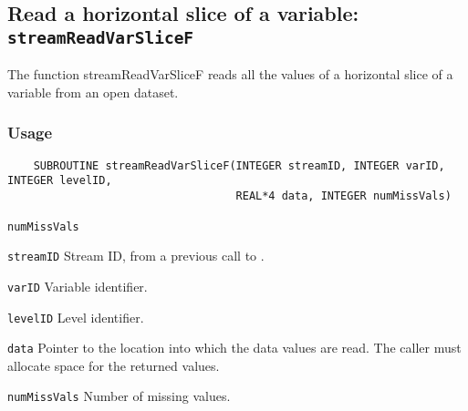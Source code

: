 \subsection{Read a horizontal slice of a variable: \texttt{streamReadVarSliceF}}
\label{streamReadVarSliceF}

The function streamReadVarSliceF reads all the values of a horizontal slice of a variable
from an open dataset.
\subsubsection*{Usage}

\begin{verbatim}
    SUBROUTINE streamReadVarSliceF(INTEGER streamID, INTEGER varID, INTEGER levelID, 
                                   REAL*4 data, INTEGER numMissVals)
\end{verbatim}

\hspace*{4mm}\begin{minipage}[]{15cm}
\begin{deflist}{\texttt{numMissVals}\ }
\item[\texttt{streamID}]
Stream ID, from a previous call to {}.
\item[\texttt{varID}]
Variable identifier.
\item[\texttt{levelID}]
Level identifier.
\item[\texttt{data}]
Pointer to the location into which the data values are read.
                     The caller must allocate space for the returned values.
\item[\texttt{numMissVals}]
Number of missing values.

\end{deflist}
\end{minipage}
